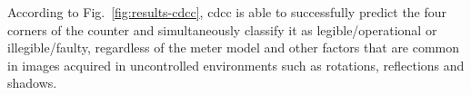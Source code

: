 \begin{table}[!htb]
\centering
\caption{\small Results achieved by \gls*{cdcc} in the counter classification task.
It is able to filter out \accfaulty\% of the illegible/faulty meters, while correctly accepting \acclegible\% (on average of both datasets) of the legible/operational meters.}
\label{tab:results-counter-classification}

\vspace{0.5mm}

 \end{table}

According to Fig.~\ref{fig:results-cdcc}, \gls*{cdcc} is able to successfully predict the four corners of the counter and simultaneously classify it as legible/operational or illegible/faulty, regardless of the meter model and other factors that are common in images acquired in uncontrolled environments such as rotations, reflections and shadows.


